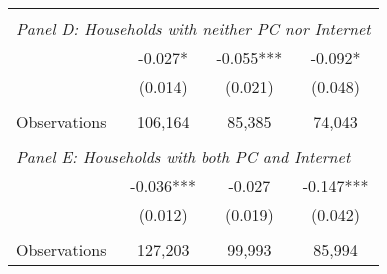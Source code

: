{\begin{tabular}{lccc}
&  &  &   \\
\multicolumn{4}{l}{\textit{Panel D: Households with neither PC nor Internet}} \\
\hspace{3mm}        &      -0.027*  &      -0.055***&      -0.092*  \\
                    &     (0.014)   &     (0.021)   &     (0.048)   \\
                    &               &               &               \\
\hspace{3mm}Observations&     106,164   &      85,385   &      74,043   \\
 
&  &  &   \\
\multicolumn{4}{l}{\textit{Panel E: Households with both PC and Internet}} \\
\hspace{3mm}        &      -0.036***&      -0.027   &      -0.147***\\
                    &     (0.012)   &     (0.019)   &     (0.042)   \\
                    &               &               &               \\
\hspace{3mm}Observations&     127,203   &      99,993   &      85,994   \\
 

\bottomrule
\end{tabular}
}
